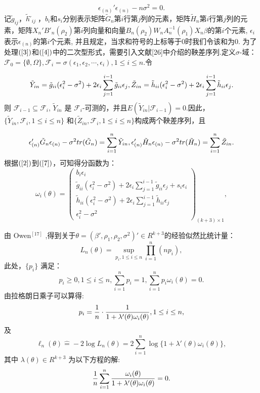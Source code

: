 \documentclass[onecolumn]{ctexart}	%
\begin{document}
\begin{equation}
    \epsilon_{(n)}'\epsilon_{(n)} -n\sigma^{2}=0. \label{5}
\end{equation}
记$\tilde{g}_{ij}$，$\tilde{h} ̃_{ij}$，$b_i$和$s_i$分别表示矩阵$\tilde{G}_n$第$i$行第$j$列的元素，矩阵$\tilde{H}_n$第$i$行第$j$列的元素，矩阵$X_n'B'_n(\rho_2)$第$i$列向量和向量$B_n (\rho_2 )W_nA_n^{-1} (\rho_1 )X_n\beta $的第$i$个元素, $\epsilon_i$表示$\epsilon_{(n)}$的第$i$个元素, 并且规定，当求和符号的上标等于0时我们令该和为0. 为了处理$\rm(\ref{3}) $和$\rm(\ref{4}) $中的二次型形式，需要引入文献[26]中介绍的鞅差序列.定义$\sigma$-域：${\mathcal{F}}_{0}=\{ {\emptyset}, \Omega\}, {\mathcal{F}}_{i}=\sigma(\epsilon_{1}, \epsilon_{2}, \cdots, \epsilon_i), 1\leq i\leq n$.令

\begin{equation}
    \tilde{Y}_{in} =\tilde{g}_{ii} (\epsilon_i^2-\sigma^2 )+2\epsilon_i\sum_{j=1}^{i-1} \tilde{g}_{ii}\epsilon_j, \tilde{Z}_{in} =\tilde{h}_{ii} (\epsilon_i^2-\sigma^2 )+2\epsilon_i\sum_{j=1}^{i-1} \tilde{h}_{ii}\epsilon_j. \label{6}\\
\end{equation}
则 $ {\mathcal{F}}_{i-1}  \subseteq {\mathcal{F}}_{i}$, $\tilde{Y}_{in}$ 是 ${\mathcal{F}}_{i}$-可测的，并且$E(\tilde{Y}_{in}|{\mathcal{F}}_{i-1})=0$.因此，$\{\tilde{Y}_{in}, {\mathcal{F}}_{i}, 1 \leq i\leq n\}$ 和$\{\tilde{Z}_{in}, {\mathcal{F}}_{i}, 1 \leq i\leq n\}$构成两个鞅差序列，且

\begin{equation}
   \epsilon_{(n)}'\tilde{G}_n\epsilon_{(n)}-\sigma^{2}tr(\tilde{G}_n)=\sum_{i=1}^{n} \tilde{Y}_{in}, \epsilon_{(n)}'\tilde{H}_n\epsilon_{(n)}-\sigma^{2}tr(\tilde{H}_n)=\sum_{i=1}^{n} \tilde{Z}_{in} .\label{7}\\
\end{equation}
根据$\rm(\ref{2}) $到$\rm(\ref{7}) $，可知得分函数为：
\[
\omega_i(\theta)=\left ( 
	\begin{array}{cccc} 
		b_i\epsilon_i\\
		\tilde{g}_{ii} (\epsilon_i^2-\sigma^2 ) + 2\epsilon_i\sum_{j=1}^{i-1} \tilde{g}_{ii}\epsilon_j + s_i\epsilon_i\\
		\tilde{h}_{ii} (\epsilon_i^2-\sigma^2 )+2\epsilon_i\sum_{j=1}^{i-1} \tilde{h}_{ii}\epsilon_j\\
		\epsilon_i^2-\sigma^2
	\end{array} \right)_{(k+3)\times1},
\]

由 Owen$^{[17]}$ ,得到关于$\theta=(\beta', \rho_1,\rho_2,\sigma^2)'\in R^{k+3}$的经验似然比统计量：
$$L_n(\theta)=\sup_{p_i, 1\leq i\leq n} \prod^n_{i=1}(np_i) , $$
此处，$\{p_i\}$ 满足：
$$p_i\geq 0, 1\leq i\leq n,  \sum^n_{i=1}p_i =1,  \sum^n_{i=1}p_i \omega_i(\theta)=0.$$
由拉格朗日乘子可以算得:
$$ p_i ={ 1\over n}\cdot{1 \over 1+\lambda'(\theta)\omega_i(\theta)}, 1\leq i\leq n,$$
及
$$\ell_n(\theta)  \hat{=} -2\log L_n(\theta)=2\sum^n_{i=1}\log \{1+\lambda'(\theta)\omega_i(\theta)\},$$
其中 $\lambda(\theta)\in R^{k+3}$ 为以下方程的解:
\begin{equation}
{1\over n}\sum^n_{i=1}{\omega_i(\theta)\over 1+\lambda'(\theta)\omega_i(\theta)}=0.  \label{eq} 
\end{equation}
\end{document}
